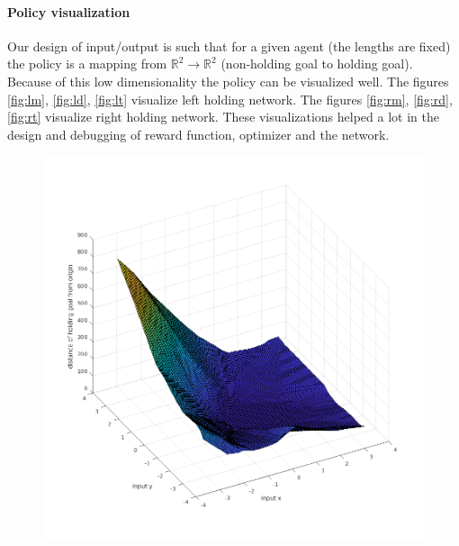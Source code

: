 \documentclass[12pt]{article}
\begin{document}
\paragraph{Policy visualization}
Our design of input/output is such that for a given agent (the lengths are fixed) the policy is a mapping from $\mathbb{R}^2 \to \mathbb{R}^2$ (non-holding goal to holding goal).
Because of this low dimensionality the policy can be visualized well.
The figures \ref{fig:lm}, \ref{fig:ld}, \ref{fig:lt} visualize left holding network.
The figures \ref{fig:rm}, \ref{fig:rd}, \ref{fig:rt} visualize right holding network.
These visualizations helped a lot in the design and debugging of reward function, optimizer and the network.
\begin{figure}[!htb]
\includegraphics[width=\linewidth]{figures/left/zoomed_out.png}
\endminipage\hfill
{}

\end{figure}
\end{document}
